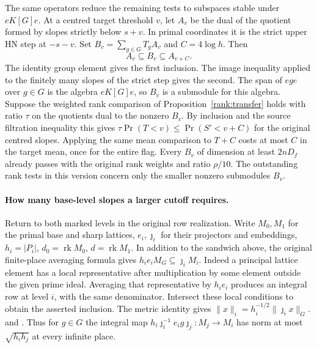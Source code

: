 The same operators reduce the remaining tests to subspaces stable
under \(eK[G]e\). At a centred target threshold \(v\), let \(A_v\)
be the dual of the quotient formed by slopes strictly below \(s+v\).
In primal coordinates it is the strict upper HN step at \(-s-v\).
Set \(B_v=\sum_{g\in G}T_g A_v\) and \(C=4\log h\). Then
\[
               A_v\subseteq B_v\subseteq A_{v+C}.
\]
The identity group element gives the first inclusion. The image
inequality applied to the finitely many slopes of the strict step
gives the second. The span of \(ege\) over \(g\in G\) is the
algebra \(eK[G]e\), so \(B_v\) is a submodule for this algebra.
Suppose the weighted rank comparison of Proposition~\ref{rank:transfer}
holds with ratio \(\tau\) on the quotients dual to the nonzero
\(B_v\). By inclusion and the source filtration inequality this gives
\(\tau\Pr(T<v)\le\Pr(S'<v+C)\) for the original centred slopes.
Applying the same mean comparison to \(T+C\) costs at most \(C\)
in the target mean, once for the entire flag. Every \(B_v\) of
dimension at least \(2nD_f\) already passes with the original rank
weights and ratio \(\rho/10\). The outstanding rank tests in this
version concern only the smaller nonzero submodules \(B_v\).

\paragraph{How many base-level slopes a larger cutoff requires.}
Return to both marked levels in the original row realization. Write
\(M_0,M_1\) for the primal base and sharp lattices, \(e_i,\jmath_i\)
for their projectors and embeddings, \(h_i=|P_i|\),
\(d_0=\operatorname{rk}M_0\), \(d=\operatorname{rk}M_1\).
In addition to the sandwich above, the original finite-place
averaging formula gives \(h_i e_i M_G\subseteq\jmath_i M_i\).
Indeed a principal lattice element has a local representative after
multiplication by some element outside the given prime ideal.
Averaging that representative by \(h_i e_i\) produces an integral
row at level \(i\), with the same denominator. Intersect these
local conditions to obtain the asserted inclusion. The metric
identity gives \(\|x\|_i=h_i^{-1/2}\|\jmath_i x\|_G\).
and .
Thus for \(g\in G\) the integral map
\(h_i\jmath_i^{-1}e_i g\jmath_j:M_j\to M_i\) has norm at most
\(\sqrt{h_i h_j}\) at every infinite place.

